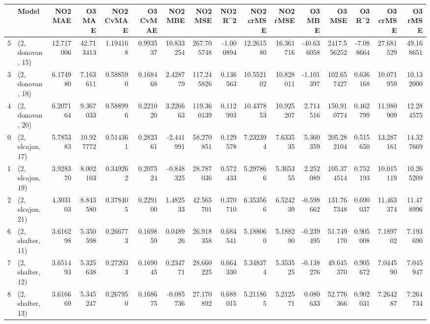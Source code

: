 \begin{tabular}{llrrrrrrrrrrrrrr}
\toprule
{} &             Model &    NO2 MAE &     O3 MAE &  NO2 CvMAE &  O3 CvMAE &    NO2 MBE &     NO2 MSE &   NO2 R\textasciicircum2 &  NO2 crMSE &   NO2 rMSE &     O3 MBE &       O3 MSE &    O3 R\textasciicircum2 &   O3 crMSE &    O3 rMSE \\
\midrule
5  &  (2, donovan, 15) &  12.717006 &  42.713413 &   1.194168 &  0.993537 &  10.833254 &  267.705748 & -1.000894 &  12.261580 &  16.361716 & -40.636058 &  2417.556252 & -7.088664 &  27.681529 &  49.168651 \\
3  &  (2, donovan, 18) &   6.174980 &   7.163611 &   0.588590 &  0.168468 &   2.428779 &  117.245826 &  0.136563 &  10.552102 &  10.828011 &  -1.101397 &   102.657427 &  0.636168 &  10.071959 &  10.132000 \\
4  &  (2, donovan, 20) &   6.207164 &   9.367033 &   0.588996 &  0.221020 &   3.226663 &  119.360139 &  0.112993 &  10.437853 &  10.925207 &   2.714516 &   150.910774 &  0.462799 &  11.980909 &  12.284575 \\
0  &  (2, elcajon, 17) &   5.785383 &  10.927772 &   0.514361 &  0.282361 &  -2.441991 &   58.270851 &  0.129578 &   7.232394 &   7.633535 &   5.360359 &   205.282104 &  0.515650 &  13.287161 &  14.327669 \\
1  &  (2, elcajon, 19) &   3.928370 &   8.002103 &   0.349262 &  0.207524 &  -0.848325 &   28.787036 &  0.572433 &   5.297866 &   5.365355 &   2.252089 &   105.374514 &  0.752193 &  10.015119 &  10.265209 \\
2  &  (2, elcajon, 21) &   4.303103 &   8.843580 &   0.378405 &  0.229100 &   1.482533 &   42.565701 &  0.370710 &   6.353566 &   6.524239 &  -0.598662 &   131.767348 &  0.690037 &  11.463374 &  11.478996 \\
6  &  (2, shafter, 11) &   3.616298 &   5.350598 &   0.266773 &  0.169859 &   0.048926 &   26.918358 &  0.684541 &   5.188060 &   5.188290 &  -0.239495 &    51.749170 &  0.905008 &   7.189702 &   7.193690 \\
7  &  (2, shafter, 12) &   3.651493 &   5.325638 &   0.272033 &  0.169045 &   0.234771 &   28.660225 &  0.664330 &   5.348374 &   5.353525 &  -0.138276 &    49.645370 &  0.905672 &   7.044590 &   7.045947 \\
8  &  (2, shafter, 13) &   3.616669 &   5.345247 &   0.267950 &  0.168675 &  -0.085736 &   27.170892 &  0.688015 &   5.211865 &   5.212571 &   0.080633 &    52.776366 &  0.902031 &   7.264287 &   7.264734 \\

\end{tabular}
